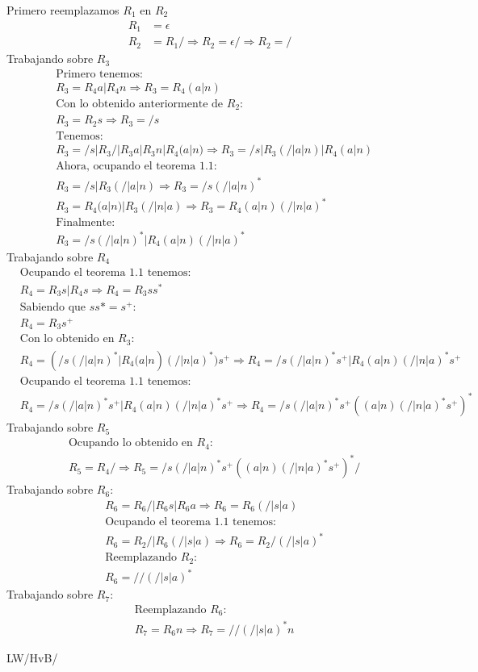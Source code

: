 \documentclass[spanish, fleqn]{article}
\begin{document}
\begin{enumerate}
    Primero reemplazamos $R_{1}$ en $R_{2}$
    \begin{align*}
    R_{1}&=\epsilon \\
    R_{2}&=R_{1}/ \Rightarrow R_{2}=\epsilon/ \Rightarrow R_{2}=/
    \end{align*}
    Trabajando sobre $R_3$
    \begin{align*}
    &\text{Primero tenemos:}\\
    &R_3=R_{4}a|R_{4}n \Rightarrow R_3=R_4(a|n)\\
    &\text{Con lo obtenido anteriormente de $R_2$:}\\
    &R_3=R_2s \Rightarrow R_3=/s\\
    &\text{Tenemos:}\\
    &R_3=/s|R_{3}/|R_{3}a|R_{3}n|R_4(a|n) \Rightarrow R_3=/s|R_3(/|a|n)|R_4(a|n) \\
    &\text{Ahora, ocupando el teorema 1.1:}\\
    &R_3=/s|R_3(/|a|n) \Rightarrow R_3=/s(/|a|n)^*\\
    &R_3=R_4(a|n)|R_3(/|n|a) \Rightarrow R_3=R_4(a|n)(/|n|a)^*\\
    &\text{Finalmente:}\\
    &R_3=/s(/|a|n)^*|R_4(a|n)(/|n|a)^*
    \end{align*}
    Trabajando sobre $R_4$
    \begin{align*}
    &\text{Ocupando el teorema 1.1 tenemos:}\\
    &R_4=R_3s|R_4s \Rightarrow R_4=R_3ss^*\\
    &\text{Sabiendo que $ss*=s^+$:}\\
    &R_4=R_3s^+\\
    &\text{Con lo obtenido en $R_3$:}\\
    &R_4=(/s(/|a|n)^*|R_4(a|n)(/|n|a)^*)s^+ \Rightarrow R_4=/s(/|a|n)^*s^+|R_4(a|n)(/|n|a)^*s^+\\
    &\text{Ocupando el teorema 1.1 tenemos:}\\
    &R_4=/s(/|a|n)^*s^+|R_4(a|n)(/|n|a)^*s^+ \Rightarrow R_4=/s(/|a|n)^*s^+((a|n)(/|n|a)^*s^+)^*
    \end{align*}
    Trabajando sobre $R_5$
    \begin{align*}
	&\text{Ocupando lo obtenido en $R_4$:}\\
    &R_5=R_4/ \Rightarrow R_5=/s(/|a|n)^*s^+((a|n)(/|n|a)^*s^+)^*/
    \end{align*}
    Trabajando sobre $R_6$:
    \begin{align*}
	&R_6=R_{6}/|R_{6}s|R_{6}a \Rightarrow R_6=R_6(/|s|a)\\
	&\text{Ocupando el teorema 1.1 tenemos:}\\
	&R_6=R_2/|R_6(/|s|a) \Rightarrow R_6=R_2/(/|s|a)^*\\
	&\text{Reemplazando $R_2$:}\\
	&R_6=//(/|s|a)^*
    \end{align*}
    Trabajando sobre $R_7$:
    \begin{align*}
    &\text{Reemplazando $R_6$:}\\
    &R_7=R_6n \Rightarrow R_7=//(/|s|a)^*n
    \end{align*}
  \end{enumerate}


  \vfill\hfill LW/HvB/\LaTeXe
\end{document}
